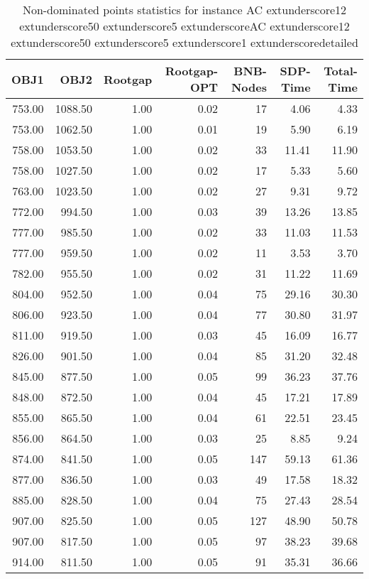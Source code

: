 \begin{table}
\caption{Non-dominated points statistics for instance AC	extunderscore12	extunderscore50	extunderscore5	extunderscoreAC	extunderscore12	extunderscore50	extunderscore5	extunderscore1	extunderscoredetailed}
\label{tab:stats/AC_12_50_5_AC_12_50_5_1_detailed}
\begin{tabular}{rrrrrrr}
\toprule
OBJ1 & OBJ2 & Rootgap & Rootgap-OPT & BNB-Nodes & SDP-Time & Total-Time \\
\midrule
753.00 & 1088.50 & 1.00 & 0.02 & 17 & 4.06 & 4.33 \\
753.00 & 1062.50 & 1.00 & 0.01 & 19 & 5.90 & 6.19 \\
758.00 & 1053.50 & 1.00 & 0.02 & 33 & 11.41 & 11.90 \\
758.00 & 1027.50 & 1.00 & 0.02 & 17 & 5.33 & 5.60 \\
763.00 & 1023.50 & 1.00 & 0.02 & 27 & 9.31 & 9.72 \\
772.00 & 994.50 & 1.00 & 0.03 & 39 & 13.26 & 13.85 \\
777.00 & 985.50 & 1.00 & 0.02 & 33 & 11.03 & 11.53 \\
777.00 & 959.50 & 1.00 & 0.02 & 11 & 3.53 & 3.70 \\
782.00 & 955.50 & 1.00 & 0.02 & 31 & 11.22 & 11.69 \\
804.00 & 952.50 & 1.00 & 0.04 & 75 & 29.16 & 30.30 \\
806.00 & 923.50 & 1.00 & 0.04 & 77 & 30.80 & 31.97 \\
811.00 & 919.50 & 1.00 & 0.03 & 45 & 16.09 & 16.77 \\
826.00 & 901.50 & 1.00 & 0.04 & 85 & 31.20 & 32.48 \\
845.00 & 877.50 & 1.00 & 0.05 & 99 & 36.23 & 37.76 \\
848.00 & 872.50 & 1.00 & 0.04 & 45 & 17.21 & 17.89 \\
855.00 & 865.50 & 1.00 & 0.04 & 61 & 22.51 & 23.45 \\
856.00 & 864.50 & 1.00 & 0.03 & 25 & 8.85 & 9.24 \\
874.00 & 841.50 & 1.00 & 0.05 & 147 & 59.13 & 61.36 \\
877.00 & 836.50 & 1.00 & 0.03 & 49 & 17.58 & 18.32 \\
885.00 & 828.50 & 1.00 & 0.04 & 75 & 27.43 & 28.54 \\
907.00 & 825.50 & 1.00 & 0.05 & 127 & 48.90 & 50.78 \\
907.00 & 817.50 & 1.00 & 0.05 & 97 & 38.23 & 39.68 \\
914.00 & 811.50 & 1.00 & 0.05 & 91 & 35.31 & 36.66 \\

\end{tabular}
\end{table}
